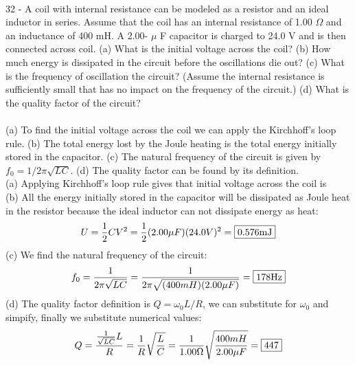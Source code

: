 \documentclass{report}
\begin{document}
\paragraph{}
32 - A coil with internal resistance can be modeled as a resistor and an ideal inductor in series. Assume that the coil has an internal resistance of 1.00 $\Omega$ and an inductance of 400 mH. A 2.00- $\mu$ F capacitor is charged to 24.0 V and is then connected across coil. (a) What is the initial voltage across the coil? (b) How much energy is dissipated in the circuit before the oscillations die out? (c) What is the frequency of oscillation the circuit? (Assume the internal resistance is sufficiently small that has no impact on the frequency of the circuit.) (d) What is the quality factor of the circuit?\\
\\
(a) To find the initial voltage across the coil we can apply the Kirchhoff's loop rule. (b) The total energy lost by the Joule heating is the total energy initially stored in the capacitor. (c) The natural frequency of the circuit is given by $f_0 = 1 / 2\pi \sqrt{LC}$. (d) The quality factor can be found by its definition.\\
(a) Applying Kirchhoff's loop rule gives that initial voltage across the coil is \\
(b) All the energy initially stored in the capacitor will be dissipated as Joule heat in the resistor because the ideal inductor can not dissipate energy as heat:
$$U = \frac{1}{2}CV^2 = \frac{1}{2}(2.00\mu F)(24.0V)^2 = \fbox{0.576mJ}$$
(c) We find the natural frequency of the circuit:
$$f_0 = \frac{1}{2\pi \sqrt{LC}} = \frac{1}{2\pi \sqrt{(400mH)(2.00\mu F)}} = \fbox{178Hz}$$
(d) The quality factor definition is $Q = \omega{_0} L / R$, we can substitute for $\omega{_0}$ and simpify, finally we substitute numerical values:
$$Q = \frac{\frac{1}{\sqrt{LC}}L}{R} = \frac{1}{R}\sqrt{\frac{L}{C}} = \frac{1}{1.00\Omega}\sqrt{\frac{400mH}{2.00\mu F}} = \fbox{447}$$
\end{document}
